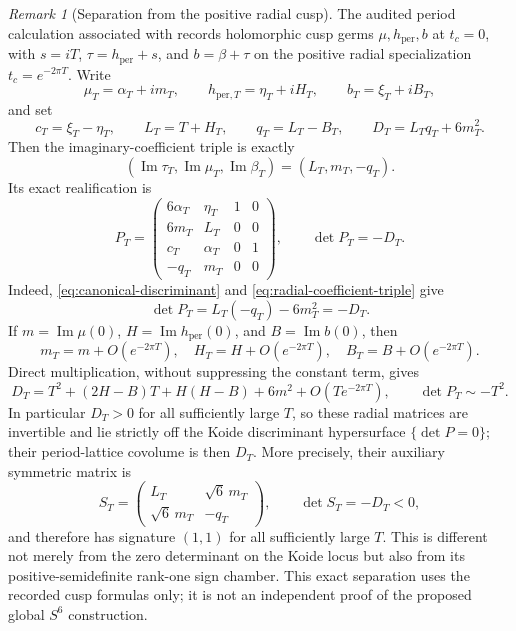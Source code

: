 \documentclass[11pt]{article}
\numberwithin{equation}{section}
\theoremstyle{definition}
\theoremstyle{remark}
\newtheorem{remark}[theorem]{Remark}
\begin{document}
\begin{remark}[Separation from the positive radial cusp]
The audited period calculation associated with \citet{AlpogeS6_2026}
records holomorphic cusp germs $\mu,h_{\mathrm{per}},b$ at $t_c=0$, with
$s=iT$, $\tau=h_{\mathrm{per}}+s$, and $b=\beta+\tau$ on the positive
radial specialization $t_c=e^{-2\pi T}$.  Write
\[
 \mu_T=\alpha_T+i m_T,\qquad
 h_{\mathrm{per},T}=\eta_T+i H_T,\qquad
 b_T=\xi_T+i B_T,
\]
and set
\[
 c_T=\xi_T-\eta_T,\qquad
 L_T=T+H_T,\qquad q_T=L_T-B_T,\qquad
 D_T=L_Tq_T+6m_T^2.
\]
Then the imaginary-coefficient triple is exactly
\begin{equation}\label{eq:radial-coefficient-triple}
 (\operatorname{Im}\tau_T,\operatorname{Im}\mu_T,
   \operatorname{Im}\beta_T)=(L_T,m_T,-q_T).
\end{equation}
Its exact realification is
\begin{equation}\label{eq:radial-real-period}
 P_T=
 \begin{pmatrix}
  6\alpha_T&\eta_T&1&0\\
  6m_T&L_T&0&0\\
  c_T&\alpha_T&0&1\\
  -q_T&m_T&0&0
 \end{pmatrix},
 \qquad \det P_T=-D_T.
\end{equation}
Indeed, \eqref{eq:canonical-discriminant} and
\eqref{eq:radial-coefficient-triple} give
\[
 \det P_T=L_T(-q_T)-6m_T^2=-D_T.
\]
If
$m=\operatorname{Im}\mu(0)$, $H=\operatorname{Im}h_{\mathrm{per}}(0)$, and
$B=\operatorname{Im}b(0)$, then
\[
 m_T=m+O(e^{-2\pi T}),\quad
 H_T=H+O(e^{-2\pi T}),\quad
 B_T=B+O(e^{-2\pi T}).
\]
Direct multiplication, without suppressing the constant term, gives
\begin{equation}\label{eq:radial-determinant-asymptotic}
 D_T=T^2+(2H-B)T+H(H-B)+6m^2+O(Te^{-2\pi T}),
 \qquad \det P_T\sim-T^2.
\end{equation}
In particular $D_T>0$ for all sufficiently large $T$, so these radial
matrices are invertible and lie strictly off the Koide discriminant
hypersurface $\{\det P=0\}$; their period-lattice covolume is then $D_T$.
More precisely, their auxiliary symmetric matrix is
\[
 S_T=\begin{pmatrix}L_T&\sqrt6\,m_T\\
                     \sqrt6\,m_T&-q_T\end{pmatrix},
 \qquad \det S_T=-D_T<0,
\]
and therefore has signature $(1,1)$ for all sufficiently large $T$.  This
is different not merely from the zero determinant on the Koide locus but
also from its positive-semidefinite rank-one sign chamber.
This exact separation uses the recorded cusp formulas only; it is not an
independent proof of the proposed global $S^6$ construction.
\end{remark}
\end{document}
